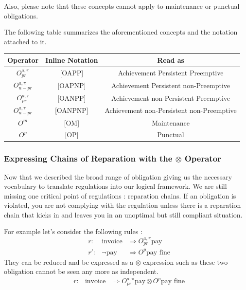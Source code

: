 \documentclass[10pt]{report}
\begin{document}
Also, please note that these concepts cannot apply to maintenance or punctual obligations.

The following table summarizes the aforementioned concepts and the notation attached to it.


\begin{center}
\begin{tabular}{c|c|c}
Operator & Inline Notation & Read as \\
\hline
$O^{a, \pi}_{pr}$     & [OAPP]  & Achievement Persistent Preemptive            \\
$O^{a, \pi}_{n-pr}$   & [OAPNP] & Achievement Persistent non-Preemptive        \\
$O^{a, \tau}_{pr}$    & [OANPP]  & Achievement non-Persistent Preemptive        \\
$O^{a, \tau}_{n-pr}$  & [OANPNP]  & Achievement non-Persistent non-Preemptive    \\
$O^{m}$               & [OM]  & Maintenance                                  \\
$O^{p}$               & [OP]  & Punctual                                     \\
\end{tabular}
\end{center}

\subsubsection{Expressing Chains of Reparation with the $\otimes$ Operator}

Now that we described the broad range of obligation giving us the necessary vocabulary to translate regulations into our logical framework. We are still missing one critical point of regulations : reparation chains. If an obligation is violated, you are not complying with the regulation unless there is a reparation chain that kicks in and leaves you in an unoptimal but still compliant situation.

 For example let's consider the following rules : 
 \[
 \begin{aligned}
   & r : &\text{invoice} & \Rightarrow O^{a, \pi}_{pr}\text{pay}\\
   & r': &\neg \text{pay} & \Rightarrow O^{p}\text{pay fine}
 \end{aligned}
 \]
 They can be reduced and be expressed as a $\otimes$-expression such as these two obligation cannot be seen any more as independent. 
  \[
 \begin{aligned}
   & r : &\text{invoice} & \Rightarrow O^{a, \pi}_{pr}\text{pay} \otimes O^{p}\text{pay fine}\\
 \end{aligned}
 \]
\end{document}
